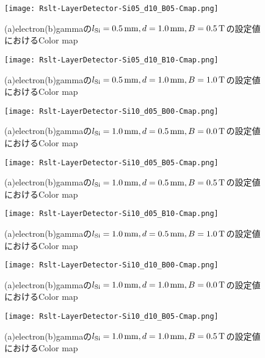 \documentclass[a4paper,10pt]{jreport}
\begin{document}
\begin{figure}[H]
	\center
	\texttt{[image: Rslt-LayerDetector-Si05\_d10\_B05-Cmap.png]}
	\caption{(a)electron(b)gammaの$l_{\rm{Si}}=\SI{0.5}{mm}, d=\SI{1.0}{mm}, B=\SI{0.5}{T}$の設定値におけるColor map}
	\label{Rslt-LayerDetector-Si05_d10_B05-Cmap}
\end{figure}

\begin{figure}[H]
	\center
	\texttt{[image: Rslt-LayerDetector-Si05\_d10\_B10-Cmap.png]}
	\caption{(a)electron(b)gammaの$l_{\rm{Si}}=\SI{0.5}{mm}, d=\SI{1.0}{mm}, B=\SI{1.0}{T}$の設定値におけるColor map}
	\label{Rslt-LayerDetector-Si05_d10_B10-Cmap}
\end{figure}

\begin{figure}[H]
	\center
	\texttt{[image: Rslt-LayerDetector-Si10\_d05\_B00-Cmap.png]}
	\caption{(a)electron(b)gammaの$l_{\rm{Si}}=\SI{1.0}{mm}, d=\SI{0.5}{mm}, B=\SI{0.0}{T}$の設定値におけるColor map}
	\label{Rslt-LayerDetector-Si10_d05_B00-Cmap}
\end{figure}

\begin{figure}[H]
	\center
	\texttt{[image: Rslt-LayerDetector-Si10\_d05\_B05-Cmap.png]}
	\caption{(a)electron(b)gammaの$l_{\rm{Si}}=\SI{1.0}{mm}, d=\SI{0.5}{mm}, B=\SI{0.5}{T}$の設定値におけるColor map}
	\label{Rslt-LayerDetector-Si10_d05_B05-Cmap}
\end{figure}

\begin{figure}[H]
	\center
	\texttt{[image: Rslt-LayerDetector-Si10\_d05\_B10-Cmap.png]}
	\caption{(a)electron(b)gammaの$l_{\rm{Si}}=\SI{1.0}{mm}, d=\SI{0.5}{mm}, B=\SI{1.0}{T}$の設定値におけるColor map}
	\label{Rslt-LayerDetector-Si10_d05_B10-Cmap}
\end{figure}

\begin{figure}[H]
	\center
	\texttt{[image: Rslt-LayerDetector-Si10\_d10\_B00-Cmap.png]}
	\caption{(a)electron(b)gammaの$l_{\rm{Si}}=\SI{1.0}{mm}, d=\SI{1.0}{mm}, B=\SI{0.0}{T}$の設定値におけるColor map}
	\label{Rslt-LayerDetector-Si10_d10_B00-Cmap}
\end{figure}

\begin{figure}[H]
	\center
	\texttt{[image: Rslt-LayerDetector-Si10\_d10\_B05-Cmap.png]}
	\caption{(a)electron(b)gammaの$l_{\rm{Si}}=\SI{1.0}{mm}, d=\SI{1.0}{mm}, B=\SI{0.5}{T}$の設定値におけるColor map}
	\label{Rslt-LayerDetector-Si10_d10_B05-Cmap}
\end{figure}
\end{document}
